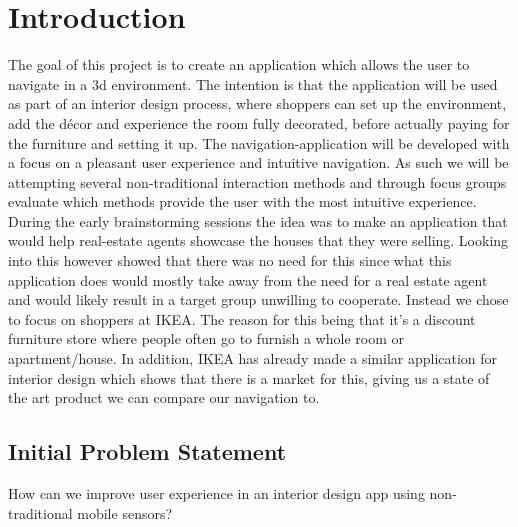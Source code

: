 \chapter{Introduction}
The goal of this project is to create an application which allows the user to navigate in a 3d environment. The intention is that the application will be used as part of an interior design process, where shoppers can set up the environment, add the décor and experience the room fully decorated, before actually paying for the furniture and setting it up.
The navigation-application will be developed with a focus on a pleasant user experience and intuitive navigation. As such we will be attempting several non-traditional interaction methods and through focus groups evaluate which methods provide the user with the most intuitive experience. 
During the early brainstorming sessions the idea was to make an application that would help real-estate agents showcase the houses that they were selling. Looking into this however showed that there was no need for this since what this application does would mostly take away from the need for a real estate agent and would likely result in a target group unwilling to cooperate. Instead we chose to focus on shoppers at IKEA. The reason for this being that it's a discount furniture store where people often go to furnish a whole room or apartment/house.
In addition, IKEA has already made a similar application for interior design which shows that there is a market for this, giving us a state of the art product we can compare our navigation to.
 
\section{Initial Problem Statement}
How can we improve user experience in an interior design app using non-traditional mobile sensors?
